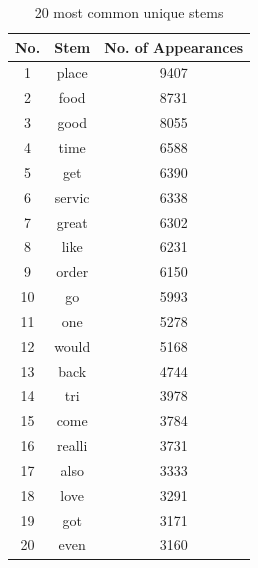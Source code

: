 \begin{table}[!h]
    \tiny
    \centering
    \caption{20 most common unique stems}
    \begin{tabular}{|c|c|c|}
        \hline
        No. & Stem & No. of Appearances  \\
        \hline
        1 & place & 9407 \\
        2 & food & 8731 \\
        3 & good & 8055 \\
        4 & time & 6588 \\
        5 & get & 6390 \\
        6 & servic & 6338 \\
        7 & great & 6302 \\
        8 & like & 6231 \\
        9 & order & 6150 \\
        10 & go & 5993 \\
        11 & one & 5278 \\
        12 & would & 5168 \\
        13 & back & 4744 \\
        14 & tri & 3978 \\
        15 & come & 3784 \\
        16 & realli & 3731 \\
        17 & also & 3333 \\
        18 & love & 3291 \\
        19 & got & 3171 \\
        20 & even & 3160\\
        \hline
    \end{tabular}
    \label{tab:most_common_stems}
\end{table}